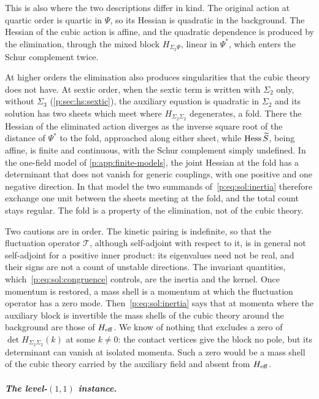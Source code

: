 This is also where the two descriptions differ in kind.
The original action at quartic order is quartic in $\Psi$, so its Hessian is quadratic in the background.
The Hessian of the cubic action is affine, and the quadratic dependence is produced by the elimination, through the mixed block $H_{\Sigma_2 \Psi}$, linear in $\Psi^*$, which enters the Schur complement twice.

At higher orders the elimination also produces singularities that the cubic theory does not have.
At sextic order, when the sextic term is written with $\Sigma_2$ only, without $\Sigma_3$ (\cref{p:sec:hs:sextic}), the auxiliary equation is quadratic in $\Sigma_2$ and its solution has two sheets which meet where $H_{\Sigma_2 \Sigma_2}$ degenerates, a fold.
There the Hessian of the eliminated action diverges as the inverse square root of the distance of $\Psi^*$ to the fold, approached along either sheet, while $\operatorname{Hess} \widetilde{S}_{}$, being affine, is finite and continuous, with the Schur complement simply undefined.
In the one-field model of \cref{p:app:finite-models}, the joint Hessian at the fold has a determinant that does not vanish for generic couplings, with one positive and one negative direction.
In that model the two summands of~\eqref{p:eq:sol:inertia} therefore exchange one unit between the sheets meeting at the fold, and the total count stays regular.
The fold is a property of the elimination, not of the cubic theory.

Two cautions are in order.
The kinetic pairing is indefinite, so that the fluctuation operator $\mathcal T$, although self-adjoint with respect to it, is in general not self-adjoint for a positive inner product: its eigenvalues need not be real, and their signs are not a count of unstable directions.
The invariant quantities, which~\eqref{p:eq:sol:congruence} controls, are the inertia and the kernel.
Once momentum is restored, a mass shell is a momentum at which the fluctuation operator has a zero mode.
Then~\eqref{p:eq:sol:inertia} says that at momenta where the auxiliary block is invertible the mass shells of the cubic theory around the background are those of $H_{\rm eff}$.
We know of nothing that excludes a zero of $\det H_{\Sigma_2 \Sigma_2}(k)$ at some $k \neq 0$: the contact vertices give the block no pole, but its determinant can vanish at isolated momenta.
Such a zero would be a mass shell of the cubic theory carried by the auxiliary field and absent from $H_{\rm eff}$.

\subparagraph{The level-\texorpdfstring{$(1, 1)$}{(1,1)} instance.}


